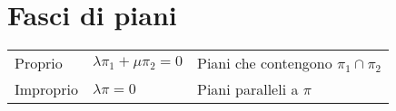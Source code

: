 \section{Fasci di piani}
\begin{tabular}{lll}
	Proprio & $\lambda\pi_1 + \mu\pi_2 = 0$ & Piani che contengono $\pi_1 \cap \pi_2$ \\
	Improprio & $\lambda\pi = 0$ & Piani paralleli a $\pi$ \\
\end{tabular}